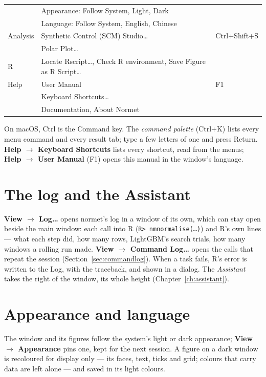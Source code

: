 \documentclass[11pt]{report}
\newcommand{\nm}{\textsf{normet}}
\newcommand{\codeunderscore}{\textunderscore\allowbreak}
\newcommand{\code}[1]{\texttt{\let\_\codeunderscore #1}}
\newcommand{\tab}[1]{\textbf{#1}}
\begin{document}
\begin{center}
\begin{tabular}{@{}lll@{}}
         & Appearance: Follow System, Light, Dark & \\
         & Language: Follow System, English, Chinese & \\
Analysis & Synthetic Control (SCM) Studio\ldots & Ctrl+Shift+S \\
         & Polar Plot\ldots                     & \\
R        & Locate Rscript\ldots, Check R environment, Save Figure as R Script\ldots & \\
Help     & User Manual                          & F1 \\
         & Keyboard Shortcuts\ldots             & \\
         & Documentation, About Normet          & \\
\bottomrule
\end{tabular}
\end{center}
On macOS, Ctrl is the Command key. The \emph{command palette} (Ctrl+K) lists every
menu command and every result tab; type a few letters of one and press Return.
\tab{Help $\rightarrow$ Keyboard Shortcuts} lists every shortcut, read from the menus;
\tab{Help $\rightarrow$ User Manual} (F1) opens this manual in the window's language.

\section{The log and the Assistant}
\tab{View $\rightarrow$ Log\ldots} opens \nm{}'s log in a window of its own, which can
stay open beside the main window: each call into R (\code{R> nm\_normalise(\ldots)}) and
R's own lines --- what each step did, how many rows, LightGBM's search trials, how many
windows a rolling run made.
\tab{View $\rightarrow$ Command Log\ldots} opens the calls that repeat the session
(Section~\ref{sec:commandlog}). When a task fails, R's error is written to the
Log, with the traceback, and shown in a dialog. The \emph{Assistant} takes the right of the
window, its whole height (Chapter~\ref{ch:assistant}).

\section{Appearance and language}\label{sec:appearance}
The window and its figures follow the system's light or dark appearance;
\tab{View $\rightarrow$ Appearance} pins one, kept for the next session. A figure on a
dark window is recoloured for display only --- its faces, text, ticks and grid; colours
that carry data are left alone --- and saved in its light colours.
\end{document}
